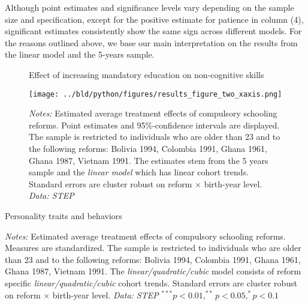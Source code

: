 Although point estimates and significance levels vary depending on the sample size and specification, except for the positive estimate for patience in column (4), significant estimates consistently show the same sign across different models. For the reasons outlined above, we base our main interpretation on the results from the linear model and the 5-years sample.


\begin{figure}[htbp]
	\centering
	\caption{Effect of increasing mandatory education on non-cognitive skills}
	\label{fig:main_results}
	\texttt{[image: ../bld/python/figures/results\_figure\_two\_xaxis.png]}
	\caption*{\footnotesize \textit{Notes:} Estimated average treatment effects of compulsory schooling reforms. Point estimates and 95\%-confidence intervals are displayed. The sample is restricted to individuals who are older than 23 and to the following reforms: Bolivia 1994, Colombia 1991, Ghana 1961, Ghana 1987, Vietnam 1991. The estimates stem from the 5 years sample and the \textit{linear model} which has linear cohort trends. Standard errors are cluster robust on reform $\times$ birth-year level. \textit{Data: STEP}}
\end{figure}

\begin{table}[htbp]
	\caption{Personality traits and behaviors}
	\label{tab:res_ncogn}
	\centering
	\begin{threeparttable}
		\footnotesize
		
		\begin{tablenotes}
			\footnotesize
			\item \textit{Notes:} Estimated average treatment effects of compulsory schooling reforms. Measures are standardized. The sample is restricted to individuals who are older than 23 and to the following reforms: Bolivia 1994, Colombia 1991, Ghana 1961, Ghana 1987, Vietnam 1991. The \textit{linear/quadratic/cubic} model consists of reform specific \textit{linear/quadratic/cubic} cohort trends. Standard errors are cluster robust on reform $\times$ birth-year level. \textit{Data: STEP} $^{***} p < 0.01, ^{**} p < 0.05, ^{*} p < 0.1$
		\end{tablenotes}
	\end{threeparttable}
\end{table}

